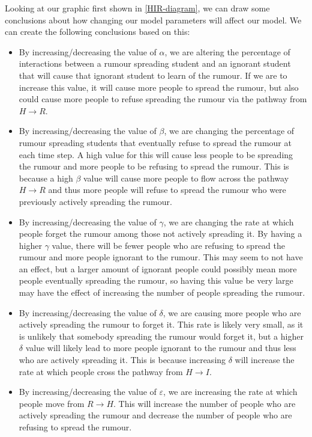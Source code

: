 \documentclass[11pt]{article}
\begin{document}
Looking at our graphic first shown in \ref{HIR-diagram}, we can draw some conclusions about how changing our model parameters will affect our model.
We can create the following conclusions based on this:
\begin{itemize}
    \item By increasing/decreasing the value of $\alpha$, we are altering the percentage of interactions between a rumour spreading student and an ignorant student that will cause that ignorant student to learn of the rumour.  If we are to increase this value, it will cause more people to spread the rumour, but also could cause more people to refuse spreading the rumour via the pathway from $H \rightarrow R$.
    \item By increasing/decreasing the value of $\beta$, we are changing the percentage of rumour spreading students that eventually refuse to spread the rumour at each time step.  A high value for this will cause less people to be spreading the rumour and more people to be refusing to spread the rumour.  This is because a high $\beta$ value will cause more people to flow across the pathway $H \rightarrow R$ and thus more people will refuse to spread the rumour who were previously actively spreading the rumour.
    \item By increasing/decreasing the value of $\gamma$, we are changing the rate at which people forget the rumour among those not actively spreading it.  By having a higher $\gamma$ value, there will be fewer people who are refusing to spread the rumour and more people ignorant to the rumour.  This may seem to not have an effect, but a larger amount of ignorant people could possibly mean more people eventually spreading the rumour, so having this value be very large may have the effect of increasing the number of people spreading the rumour.
    \item By increasing/decreasing the value of $\delta$, we are causing more people who are actively spreading the rumour to forget it.  This rate is likely very small, as it is unlikely that somebody spreading the rumour would forget it, but a higher $\delta$ value will likely lead to more people ignorant to the rumour and thus less who are actively spreading it. This is because increasing $\delta$ will increase the rate at which people cross the pathway from $H \rightarrow I$.
    \item By increasing/decreasing the value of $\varepsilon$, we are increasing the rate at which people move from $R \rightarrow H$.  This will increase the number of people who are actively spreading the rumour and decrease the number of people who are refusing to spread the rumour.
\end{itemize}
\end{document}
